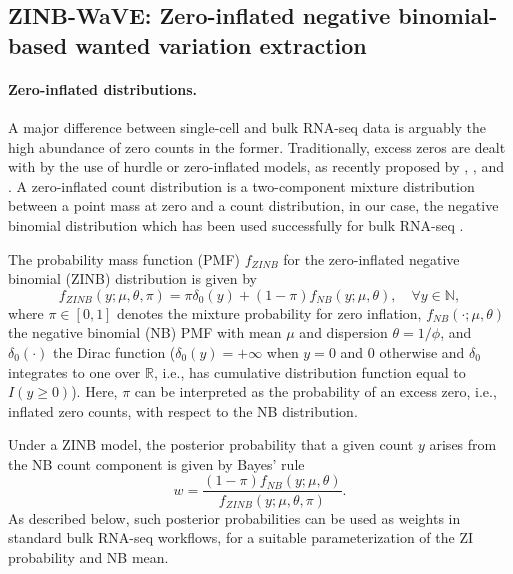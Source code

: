 \documentclass{bmcart}
\newcommand{\lc}[1]{\textcolor{ao}{*** LC: #1}}
\begin{document}
\subsection*{ZINB-WaVE: Zero-inflated negative binomial-based wanted variation extraction}

\paragraph{Zero-inflated distributions.}

A major difference between single-cell and bulk RNA-seq data is arguably the high abundance of zero counts in the former. Traditionally, excess zeros are dealt with by the use of hurdle or zero-inflated models, as recently proposed by \citet{Finak2015}, \citet{Kharchenko2014}, and \citet{Paulson2013}. A zero-inflated count distribution is a two-component mixture distribution between a point mass at zero and a count distribution, in our case, the negative binomial distribution which has been used successfully for bulk RNA-seq \citep{Love2014,Robinson2010a,Law2014,McCarthy2012a}. 

The probability mass function (PMF) $f_{ZINB}$ for the zero-inflated negative binomial (ZINB) distribution is given by
\begin{equation}
\label{e:zinb0}
f_{ZINB}(y;\mu,\theta, \pi) = \pi \delta_0(y) + (1-\pi) f_{NB}(y;\mu,\theta), \quad \forall y\in\mathbb{N},
\end{equation} 
where $\pi \in [0,1]$ denotes the mixture probability for zero inflation, $f_{NB}(\cdot ;\mu,\theta)$ the negative binomial (NB) PMF with mean $\mu$ and dispersion $\theta = 1/\phi$, and $\delta_0(\cdot)$ the Dirac function ($\delta_0(y)= +\infty$ when $y=0$ and $0$ otherwise and $\delta_0$ integrates to one over $\mathbb{R}$, i.e., has cumulative distribution function equal to $I(y \geq 0)$). Here, $\pi$ can be interpreted as the probability of an excess zero, i.e., inflated zero counts, with respect to the NB distribution.

Under a ZINB model, the posterior probability that a given count $y$ arises from the NB count component is given by Bayes' rule 
$$w = \frac{ ( 1 - \pi) f_{NB}(y; \mu, \theta ) }{f_{ZINB}(y;\mu, \theta, \pi)}.$$
As described below, such posterior probabilities can be used as weights in standard bulk RNA-seq workflows, for a suitable parameterization of the ZI probability and NB mean. 
\end{document}
